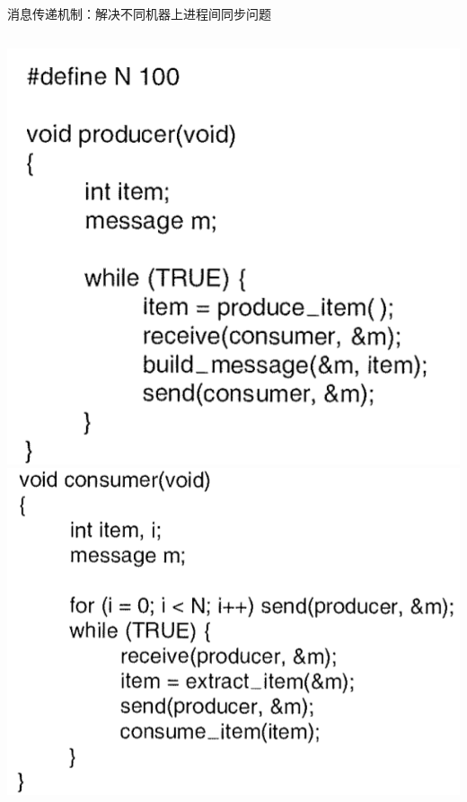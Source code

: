 \documentclass[xcolor=svgnames]{beamer}
\begin{document}
\begin{CJK*}{UTF8}{gbsn}
\begin{frame}{消息传递机制：解决不同机器上进程间同步问题}
\begin{columns}[b]
\includegraphics[width=1.0\textwidth]{msgprod.png}
\includegraphics[width=1.0\textwidth]{msgcons.png}
\end{columns}%
\end{frame}

\end{CJK*}
\end{document}
